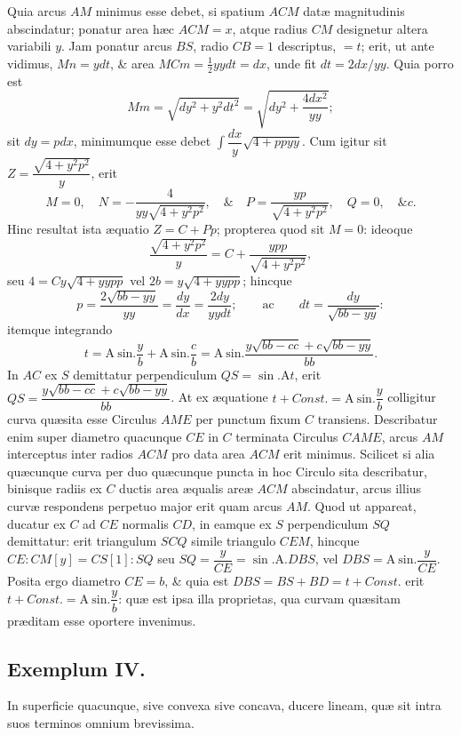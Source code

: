 Quia arcus $AM$ minimus esse debet, si spatium $ACM$ datæ magnitudinis abscindatur; ponatur area hæc $ACM=x$, atque radius $CM$ designetur altera variabili $y$. Jam ponatur
arcus $BS$, radio $CB=1$ descriptus, $=t$; erit, ut ante vidimus, $Mn=ydt$, \& area $MCm=\tfrac12yydt=dx$, unde fit $dt=2dx/yy$. Quia porro est
\[Mm=\sqrt{dy^2+y^2dt^2}=\sqrt{dy^2+\frac{4dx^2}{yy}};\]
sit $dy=pdx$, minimumque esse debet $\int\dfrac{dx}{y}\sqrt{4+ppyy}$. Cum igitur sit $Z=\dfrac{\sqrt{4+y^2p^2}}{y}$, erit
\[M=0,\quad N=-\frac{4}{yy\sqrt{4+y^2p^2}},\quad\&\quad P=\frac{yp}{\sqrt{4+y^2p^2}},\quad Q=0,\quad\&c.\]
Hinc resultat ista æquatio $Z=C+Pp$; propterea quod sit $M=0$: ideoque
\[\frac{\sqrt{4+y^2p^2}}{y}=C+\frac{ypp}{\sqrt{4+y^2p^2}},\]
seu $4=Cy\sqrt{4+yypp}$ vel $2b=y\sqrt{4+yypp}$; hincque
\[p=\frac{2\sqrt{bb-yy}}{yy}=\frac{dy}{dx}=\frac{2dy}{yydt};\qquad\text{ac}\qquad dt=\frac{dy}{\sqrt{bb-yy}}:\]
itemque integrando
\[t=\mathrm{A\ sin.}\frac{y}{b}+\mathrm{A\ sin.}\frac{c}{b}=\mathrm{A\ sin.}\frac{y\sqrt{bb-cc}+c\sqrt{bb-yy}}{bb}.\]
In $AC$ ex $S$ demittatur perpendiculum $QS=\sin.\mathrm{A}t$, erit $QS=\dfrac{y\sqrt{bb-cc}+c\sqrt{bb-yy}}{bb}$. At ex æquatione $t+\mathit{Const.}=\mathrm{A\ sin.}\dfrac{y}{b}$ colligitur curva quæsita esse Circulus $AME$ per punctum fixum $C$ transiens. Describatur enim super diametro quacunque $CE$ in $C$ terminata Circulus $CAME$, arcus $AM$ interceptus inter radios $ACM$ pro data area $ACM$ erit minimus. Scilicet si alia quæcunque curva per duo quæcunque puncta in hoc Circulo sita describatur, binisque radiis ex $C$ ductis area æqualis areæ $ACM$ abscindatur, arcus illius curvæ respondens perpetuo major erit quam arcus $AM$. Quod ut appareat, ducatur ex $C$ ad $CE$ normalis $CD$, in eamque ex $S$ perpendiculum $SQ$ demittatur: erit triangulum $SCQ$ simile triangulo $CEM$, hincque $CE:CM[y]=CS[1]:SQ$ seu $SQ=\dfrac{y}{CE}=\sin.\mathrm{A}.DBS$, vel $DBS=\mathrm{A\ sin.}\dfrac{y}{CE}$. Posita ergo diametro $CE=b$, \& quia est $DBS=BS+BD=t+\mathit{Const.}$ erit $t+\mathit{Const.}=\mathrm{A\ sin.}\dfrac{y}{b}$: quæ est ipsa illa proprietas, qua curvam quæsitam præditam esse oportere invenimus.
\subsection*{Exemplum IV.}
In superficie quacunque, sive convexa sive concava, ducere lineam, quæ sit intra suos terminos omnium brevissima.

